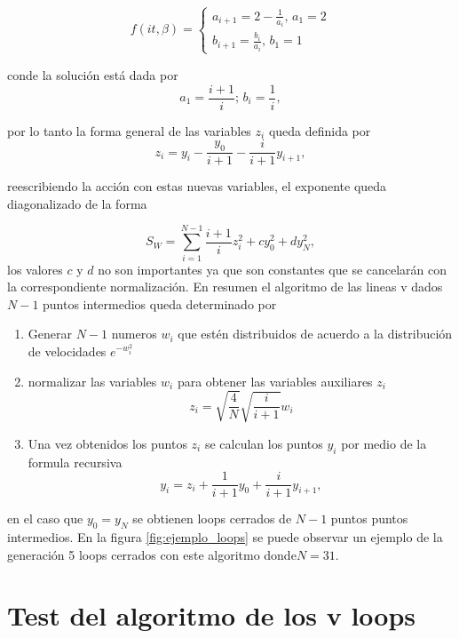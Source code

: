 \[ 
f   ( i t ,\beta )=
\begin{cases} 
	  a_{i+1} = 2 - \frac{1}{a_i},  \, a _1 = 2
\\
	  	  b_{i+1} = \frac{b _i}{a _i},  \, b _1 = 1
   \end{cases}   
\] 

conde la solución está dada por
\begin{equation}
a _1 = \frac{i+1}{i} ; \, b_i = \frac{1}{i} ,
\end{equation}

por lo tanto la forma general de las variables $z _i$ queda definida por
\begin{equation}
z _i = y _i - \frac{y_0}{i+1} - \frac{i}{i+1} y _{i+1} ,
\end{equation}

reescribiendo la acción con estas nuevas variables, el exponente queda diagonalizado de la forma

\begin{equation}
S _{W}  = \sum _{i = 1} ^{N-1} \frac{i +1}{i} z _i ^2 + c y _0 ^2 + d y _N ^2
, 
\end{equation}
los valores $c$ y $d$ no son importantes ya que son constantes que se cancelarán con la correspondiente normalización.
En resumen el algoritmo de las lineas v dados $N-1$ puntos intermedios queda determinado por 
\begin{enumerate}
\item Generar $N-1$ numeros $w_i$ que estén distribuidos de acuerdo a la distribución de velocidades $e^{- w _{i} ^2}$
\item normalizar las variables $w _i$ para obtener las variables auxiliares $z _i$
	\begin{equation}
	z _i = \sqrt{\frac{4}{N}} \sqrt{\frac{i}{i+1}} w _i
	\end{equation}

\item Una vez obtenidos los puntos $ z_i$ se calculan los puntos $ y_i$ por medio de la formula recursiva
	\begin{equation}
	y _i = z _i + \frac{1}{i+1} y_0 + \frac{i}{i+1} y _{i+1} ,
	\end{equation}
\end{enumerate}
en el caso que $y_0 = y _N$ se obtienen loops cerrados de $N-1$ puntos puntos intermedios.
En la figura \ref{fig:ejemplo_loops} se puede observar un ejemplo de la generación 5 loops cerrados con este algoritmo donde$N=31$.


\section{Test del algoritmo de los v loops}



